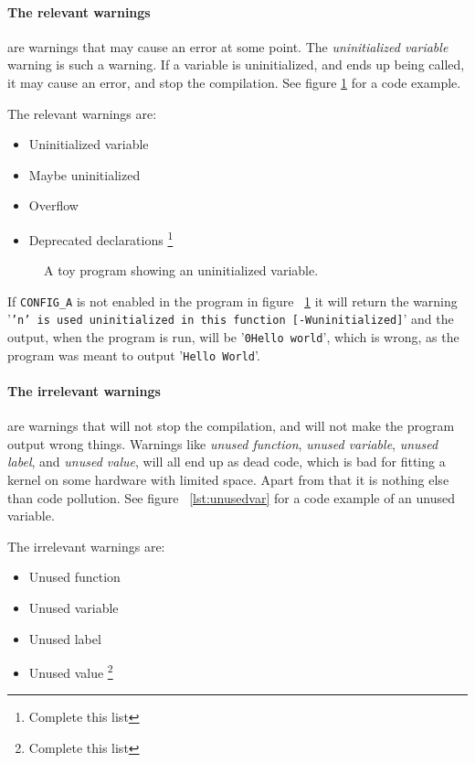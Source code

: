 \documentclass[a4paper,11pt]{report}
\newcommand{\textcode}[1]{
    \fboxsep=1pt
    \texttt{\colorbox{gray!20}{#1}}
}
\newcommand{\figa}{
    \begin{figure}[!htpb]
    \centering
}
\newcommand{\figb}[2]{
    \caption{#1}
    \label{#2}
    \end{figure}
}
\begin{document}
    \paragraph{The relevant warnings}
are warnings that may cause an error at some point. The \emph{uninitialized 
variable} warning is such a warning. If a variable is uninitialized, and ends 
up being called, it may cause an error, and stop the compilation. See figure 
\ref{lst:uninitvar} for a code example.

The relevant warnings are:

\begin{itemize}
    \item Uninitialized variable
    \item Maybe uninitialized
    \item Overflow
    \item Deprecated declarations
        \footnote{Complete this list}
\end{itemize}

\figa
    
\figb{A toy program showing an uninitialized variable.}{lst:uninitvar}

If \textcode{CONFIG\_A} is not enabled in the program in figure 
~\ref{lst:uninitvar} it will return the warning 
'\texttt{'n' is used uninitialized in this function [-Wuninitialized]}' and the 
output, when the program is run, will be '\texttt{0Hello world}',
which is wrong, as the program was meant to output '\texttt{Hello World}'.

    \paragraph{The irrelevant warnings}
are warnings that will not stop the compilation, and will not make the program 
output wrong things. Warnings like \emph{unused function}, \emph{unused 
variable}, \emph{unused label}, and \emph{unused value}, will all end up as 
dead code, which is bad for fitting a kernel on some hardware with limited 
space. Apart from that it is nothing else than code pollution. See figure 
~\ref{lst:unusedvar} for a code example  of an unused variable.

The irrelevant warnings are:

\begin{itemize}
    \item Unused function
    \item Unused variable
    \item Unused label
    \item Unused value
        \footnote{Complete this list}
\end{itemize}
\end{document}
